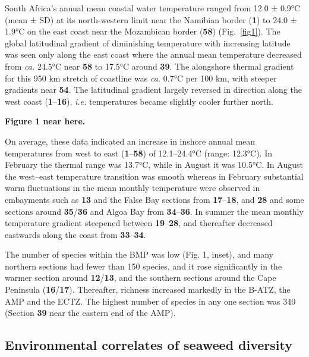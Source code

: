 \documentclass[utf8]{frontiersSCNS} %
\begin{document}
South Africa's annual mean coastal water temperature ranged from 12.0 ± 0.9°C (mean ± SD) at its north-western limit near the Namibian border (\textbf{1}) to 24.0 ± 1.9°C on the east coast near the Mozambican border (\textbf{58}) (Fig.~\ref{fig1}). The global latitudinal gradient of diminishing temperature with increasing latitude was seen only along the east coast where the annual mean temperature decreased from \emph{ca.} 24.5°C near \textbf{58} to 17.5°C around \textbf{39}. The alongshore thermal gradient for this 950 km stretch of coastline was \emph{ca.} 0.7°C per 100 km, with steeper gradients near \textbf{54}. The latitudinal gradient largely reversed in direction along the west coast (\textbf{1}--\textbf{16}), \emph{i.e.} temperatures became slightly cooler further north.

\textbf{Figure 1 near here.}

On average, these data indicated an increase in inshore annual mean temperatures from west to east (\textbf{1}--\textbf{58}) of 12.1--24.4°C (range: 12.3°C). In February the thermal range was 13.7°C, while in August it was 10.5°C. In August the west--east temperature transition was smooth whereas in February substantial warm fluctuations in the mean monthly temperature were observed in embayments such as \textbf{13} and the False Bay sections from \textbf{17}--\textbf{18}, and \textbf{28} and some sections around \textbf{35}/\textbf{36} and Algoa Bay from \textbf{34}--\textbf{36}. In summer the mean monthly temperature gradient steepened between \textbf{19}--\textbf{28}, and thereafter decreased eastwards along the coast from \textbf{33}--\textbf{34}.

The number of species within the BMP was low (Fig. 1, inset), and many northern sections had fewer than 150 species, and it rose significantly in the warmer section around \textbf{12}/\textbf{13}, and the southern sections around the Cape Peninsula (\textbf{16}/\textbf{17}). Thereafter, richness increased markedly in the B-ATZ, the AMP and the ECTZ. The highest number of species in any one section was 340 (Section \textbf{39} near the eastern end of the AMP).

\subsection{Environmental correlates of seaweed diversity}
\end{document}
